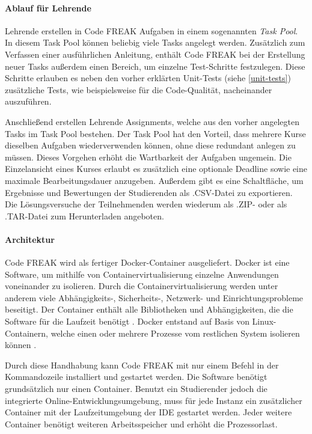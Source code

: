 \paragraph{Ablauf für Lehrende}
Lehrende erstellen in Code FREAK Aufgaben in einem sogenannten \emph{Task Pool}.
In diesem Task Pool können beliebig viele Tasks angelegt werden. Zusätzlich zum
Verfassen einer ausführlichen Anleitung, enthält Code FREAK bei der Erstellung
neuer Tasks außerdem einen Bereich, um einzelne Test-Schritte festzulegen. Diese
Schritte erlauben es neben den vorher erklärten Unit-Tests (siehe
\autoref{unit-tests}) zusätzliche Tests, wie beispielsweise für die
Code-Qualität, nacheinander auszuführen.

Anschließend erstellen Lehrende Assignments, welche aus den vorher angelegten
Tasks im Task Pool bestehen. Der Task Pool hat den Vorteil, dass mehrere Kurse
dieselben Aufgaben wiederverwenden können, ohne diese redundant anlegen zu
müssen. Dieses Vorgehen erhöht die Wartbarkeit der Aufgaben ungemein. Die
Einzelansicht eines Kurses erlaubt es zusätzlich eine optionale Deadline sowie
eine maximale Bearbeitungsdauer anzugeben. Außerdem gibt es eine Schaltfläche,
um Ergebnisse und Bewertungen der Studierenden als .CSV-Datei zu exportieren.
Die Lösungsversuche der Teilnehmenden werden wiederum als .ZIP- oder als
.TAR-Datei zum Herunterladen angeboten.

\paragraph{Architektur}
Code FREAK wird als fertiger Docker-Container ausgeliefert. Docker ist eine
Software, um mithilfe von Containervirtualisierung einzelne Anwendungen
voneinander zu isolieren. Durch die Containervirtualisierung werden unter
anderem viele Abhängigkeits-, Sicherheits-, Netzwerk- und Einrichtungsprobleme
beseitigt. Der Container enthält alle Bibliotheken und Abhängigkeiten, die die
Software für die Laufzeit benötigt \parencite{docker}. Docker entstand auf Basis
von Linux-Containern, welche einen oder mehrere Prozesse vom restlichen System
isolieren können 
\parencite{linux-container}.

Durch diese Handhabung kann Code FREAK mit nur einem Befehl in der
Kommandozeile installiert und gestartet werden. Die Software benötigt
grundsätzlich nur einen Container. Benutzt ein Studierender jedoch die
integrierte Online-Entwicklungsumgebung, muss für jede Instanz ein zusätzlicher
Container mit der Laufzeitumgebung der IDE gestartet werden. Jeder weitere
Container benötigt weiteren Arbeitsspeicher und erhöht die Prozessorlast.

